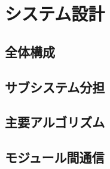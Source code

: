 \chapter{システム設計}
\label{ch:system_design}

\section{全体構成}

\section{サブシステム分担}

\section{主要アルゴリズム}

\section{モジュール間通信}
